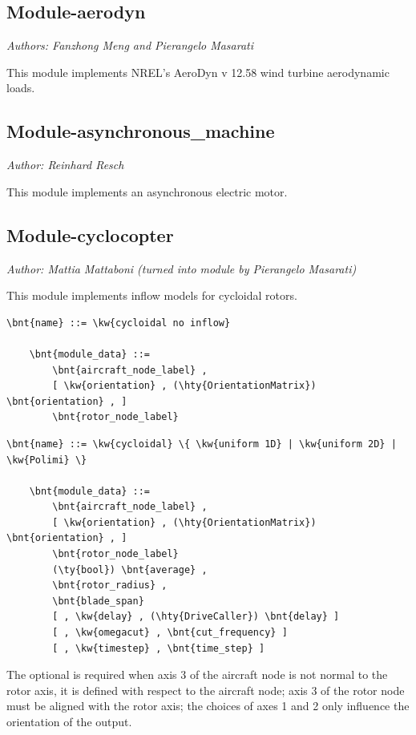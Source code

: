 \subsection{Module-aerodyn}
\emph{Authors: Fanzhong Meng and Pierangelo Masarati}

\noindent
This module implements NREL's AeroDyn v 12.58 wind turbine aerodynamic loads.

\subsection{Module-asynchronous\_machine}
\emph{Author: Reinhard Resch}

\noindent
This module implements an asynchronous electric motor.

\subsection{Module-cyclocopter}
\label{sec:MODULES:CYCLOCOPTER}
\emph{Author: Mattia Mattaboni (turned into module by Pierangelo Masarati)}

\noindent
This module implements inflow models for cycloidal rotors.

\begin{Verbatim}[commandchars=\\\{\}]
    \bnt{name} ::= \kw{cycloidal no inflow}

    \bnt{module_data} ::=
        \bnt{aircraft_node_label} ,
        [ \kw{orientation} , (\hty{OrientationMatrix}) \bnt{orientation} , ]
        \bnt{rotor_node_label}
\end{Verbatim}

\begin{Verbatim}[commandchars=\\\{\}]
    \bnt{name} ::= \kw{cycloidal} \{ \kw{uniform 1D} | \kw{uniform 2D} | \kw{Polimi} \}

    \bnt{module_data} ::=
        \bnt{aircraft_node_label} ,
        [ \kw{orientation} , (\hty{OrientationMatrix}) \bnt{orientation} , ]
        \bnt{rotor_node_label}
        (\ty{bool}) \bnt{average} ,
        \bnt{rotor_radius} ,
        \bnt{blade_span}
        [ , \kw{delay} , (\hty{DriveCaller}) \bnt{delay} ]
        [ , \kw{omegacut} , \bnt{cut_frequency} ]
        [ , \kw{timestep} , \bnt{time_step} ]
\end{Verbatim}


The optional  is required when axis 3 
of the aircraft node is not normal to the rotor axis, it is defined with respect to the aircraft node; axis 3
of the rotor node must be aligned with the rotor axis; the choices of axes 1 and 2 only influence the orientation of the output.

